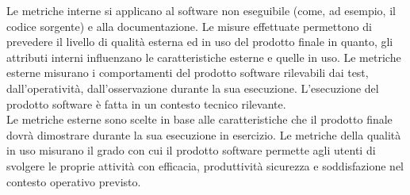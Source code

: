 		Le metriche interne si applicano al software non eseguibile (come, ad esempio, il codice sorgente) e alla documentazione. Le misure effettuate permettono di prevedere il livello di qualità esterna ed in uso del prodotto finale in quanto, gli attributi interni influenzano le caratteristiche esterne e quelle in uso.
		Le metriche esterne misurano i comportamenti del prodotto software rilevabili dai test, dall'operatività, dall'osservazione durante la sua esecuzione. L'esecuzione del prodotto software è fatta in un contesto tecnico rilevante.\\
		Le metriche esterne sono scelte in base alle caratteristiche che il prodotto finale dovrà dimostrare durante la sua esecuzione in esercizio.
		Le metriche della qualità in uso misurano il grado con cui il prodotto software permette agli utenti di svolgere le proprie attività con efficacia, produttività sicurezza e soddisfazione nel contesto operativo previsto.
